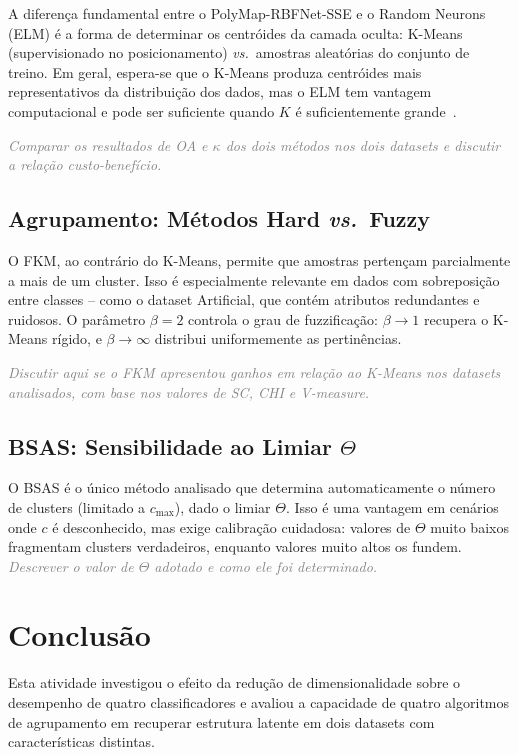 \documentclass[12pt, a4paper]{article}
\newcommand{\placeholder}[1]{\textcolor{gray}{\textit{#1}}}
\begin{document}
A diferença fundamental entre o PolyMap-RBFNet-SSE e o Random Neurons (ELM) é a forma de determinar os centróides da camada oculta: K-Means (supervisionado no posicionamento) \textit{vs.}\ amostras aleatórias do conjunto de treino. Em geral, espera-se que o K-Means produza centróides mais representativos da distribuição dos dados, mas o ELM tem vantagem computacional e pode ser suficiente quando $K$ é suficientemente grande~\cite{negri2021}.

\placeholder{Comparar os resultados de OA e $\kappa$ dos dois métodos nos dois datasets e discutir a relação custo-benefício.}

\subsection{Agrupamento: Métodos Hard \textit{vs.}\ Fuzzy}

O FKM, ao contrário do K-Means, permite que amostras pertençam parcialmente a mais de um cluster. Isso é especialmente relevante em dados com sobreposição entre classes -- como o dataset Artificial, que contém atributos redundantes e ruidosos. O parâmetro $\beta=2$ controla o grau de fuzzificação: $\beta \to 1$ recupera o K-Means rígido, e $\beta \to \infty$ distribui uniformemente as pertinências.

\placeholder{Discutir aqui se o FKM apresentou ganhos em relação ao K-Means nos datasets analisados, com base nos valores de SC, CHI e V-measure.}

\subsection{BSAS: Sensibilidade ao Limiar $\Theta$}

O BSAS é o único método analisado que determina automaticamente o número de clusters (limitado a $c_{\max}$), dado o limiar $\Theta$. Isso é uma vantagem em cenários onde $c$ é desconhecido, mas exige calibração cuidadosa: valores de $\Theta$ muito baixos fragmentam clusters verdadeiros, enquanto valores muito altos os fundem. \placeholder{Descrever o valor de $\Theta$ adotado e como ele foi determinado.}

\section{Conclusão}
\label{sec:conclusao}

Esta atividade investigou o efeito da redução de dimensionalidade sobre o desempenho de quatro classificadores e avaliou a capacidade de quatro algoritmos de agrupamento em recuperar estrutura latente em dois datasets com características distintas.
\end{document}
